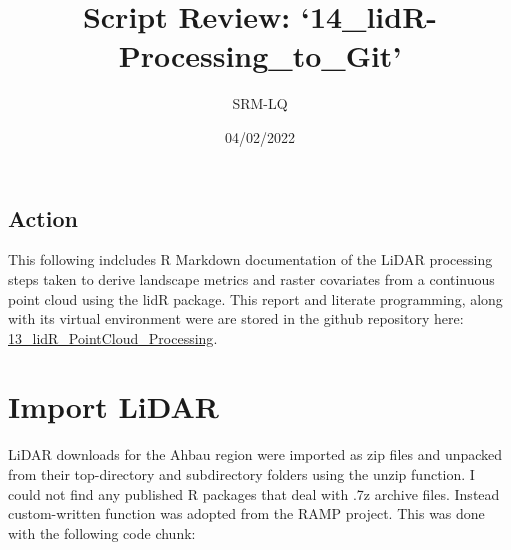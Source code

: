 \documentclass[
]{article}
\title{Script Review: `14\_lidR-Processing\_to\_Git'}
\author{SRM-LQ}
\date{04/02/2022}
\begin{document}
\maketitle

{
\setcounter{tocdepth}{5}
\tableofcontents
}
\hypertarget{action}{%
\subsection*{Action}\label{action}}

This following indcludes R Markdown documentation of the LiDAR
processing steps taken to derive landscape metrics and raster covariates
from a continuous point cloud using the lidR package. This report and
literate programming, along with its virtual environment were are stored
in the github repository here:
\href{https://github.com/seamusrobertmurphy/13_lidR_PointCloud_Processing.git}{13\_lidR\_PointCloud\_Processing}.

\hypertarget{import-lidar}{%
\section{Import LiDAR}\label{import-lidar}}

LiDAR downloads for the Ahbau region were imported as zip files and
unpacked from their top-directory and subdirectory folders using the
unzip function. I could not find any published R packages that deal with
.7z archive files. Instead custom-written function was adopted from the
RAMP project. This was done with the following code chunk:
\end{document}
